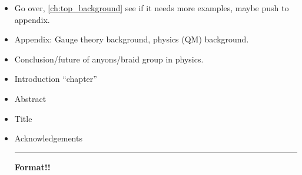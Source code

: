 \begin{itemize}
    \begin{center}\rule{.85\textwidth}{0.65pt}\end{center}
    \item Go over, \cref{ch:top_background} see if it needs more examples, maybe push to appendix.
    \item Appendix: Gauge theory background, physics (QM) background.
    \item Conclusion/future of anyons/braid group in physics.
    \item Introduction ``chapter''
    \item Abstract
    \item Title
    \item Acknowledgements
    
    \begin{center}\rule{.85\textwidth}{0.65pt}\end{center}
    
    \textbf{Format!!}
\end{itemize}
